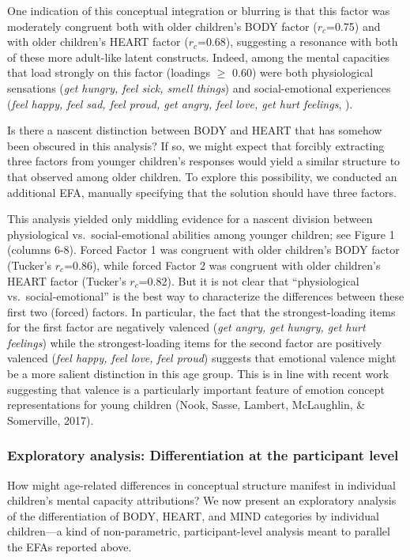 \documentclass[10pt, letterpaper]{article}
\begin{document}
One indication of this conceptual integration or blurring is that this
factor was moderately congruent both with older children's BODY factor
(\emph{\(r_c\)}=0.75) and with older children's HEART factor
(\emph{\(r_c\)}=0.68), suggesting a resonance with both of these more
adult-like latent constructs. Indeed, among the mental capacities that
load strongly on this factor (loadings \(\geq\) 0.60) were both
physiological sensations (\emph{get hungry, feel sick, smell things})
and social-emotional experiences (\emph{feel happy, feel sad, feel
proud, get angry, feel love, get hurt feelings}, ).

Is there a nascent distinction between BODY and HEART that has somehow
been obscured in this analysis? If so, we might expect that forcibly
extracting three factors from younger children's responses would yield a
similar structure to that observed among older children. To explore this
possibility, we conducted an additional EFA, manually specifying that
the solution should have three factors.

This analysis yielded only middling evidence for a nascent division
between physiological vs.~social-emotional abilities among younger
children; see Figure 1 (columns 6-8). Forced Factor 1 was congruent with
older children's BODY factor (Tucker's \(r_c\)=0.86), while forced
Factor 2 was congruent with older children's HEART factor (Tucker's
\(r_c\)=0.82). But it is not clear that ``physiological
vs.~social-emotional'' is the best way to characterize the differences
between these first two (forced) factors. In particular, the fact that
the strongest-loading items for the first factor are negatively valenced
(\emph{get angry, get hungry, get hurt feelings}) while the
strongest-loading items for the second factor are positively valenced
(\emph{feel happy, feel love, feel proud}) suggests that emotional
valence might be a more salient distinction in this age group. This is
in line with recent work suggesting that valence is a particularly
important feature of emotion concept representations for young children
(Nook, Sasse, Lambert, McLaughlin, \& Somerville, 2017).

\subsubsection{Exploratory analysis: Differentiation at the participant
level}\label{exploratory-analysis-differentiation-at-the-participant-level}

How might age-related differences in conceptual structure manifest in
individual children's mental capacity attributions? We now present an
exploratory analysis of the differentiation of BODY, HEART, and MIND
categories by individual children---a kind of non-parametric,
participant-level analysis meant to parallel the EFAs reported above.
\end{document}

